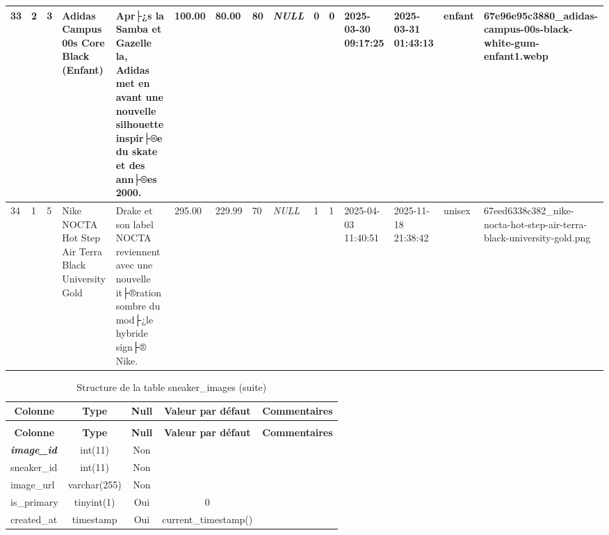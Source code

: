 \begin{longtable}{|l|l|l|l|l|l|l|l|l|l|l|l|l|l|l|}
33 & 2 & 3 & Adidas Campus 00s Core Black (Enfant) & Apr├¿s la Samba et Gazelle la, Adidas  met en avant une nouvelle silhouette inspir├®e du skate et des ann├®es 2000. & 100.00 & 80.00 & 80 & \textit{NULL} & 0 & 0 & 2025-03-30 09:17:25 & 2025-03-31 01:43:13 & enfant & 67e96e95c3880\_adidas-campus-00s-black-white-gum-enfant1.webp \\ \hline 
34 & 1 & 5 & Nike NOCTA Hot Step Air Terra Black University Gold & Drake et son label NOCTA reviennent avec une nouvelle it├®ration sombre du mod├¿le hybride sign├® Nike. & 295.00 & 229.99 & 70 & \textit{NULL} & 1 & 1 & 2025-04-03 11:40:51 & 2025-11-18 21:38:42 & unisex & 67eed6338c382\_nike-nocta-hot-step-air-terra-black-university-gold.png \\ \hline 
 \end{longtable}

%
%
 \begin{longtable}{|l|c|c|c|l|} 
 \caption{Structure de la table sneaker\_images} \label{tab:sneaker_images-structure} \\
 \hline \multicolumn{1}{|c|}{\textbf{Colonne}} & \multicolumn{1}{|c|}{\textbf{Type}} & \multicolumn{1}{|c|}{\textbf{Null}} & \multicolumn{1}{|c|}{\textbf{Valeur par défaut}} & \multicolumn{1}{|c|}{\textbf{Commentaires}} \\ \hline \hline
\endfirsthead
 \caption{Structure de la table sneaker\_images (suite)} \\ 
 \hline \multicolumn{1}{|c|}{\textbf{Colonne}} & \multicolumn{1}{|c|}{\textbf{Type}} & \multicolumn{1}{|c|}{\textbf{Null}} & \multicolumn{1}{|c|}{\textbf{Valeur par défaut}} & \multicolumn{1}{|c|}{\textbf{Commentaires}} \\ \hline \hline \endhead \endfoot 
\textbf{\textit{image\_id}} & int(11) & Non &  \\ \hline 
sneaker\_id & int(11) & Non &  \\ \hline 
image\_url & varchar(255) & Non &  \\ \hline 
is\_primary & tinyint(1) & Oui & 0 \\ \hline 
created\_at & timestamp & Oui & current\_timestamp() \\ \hline 
 \end{longtable}

